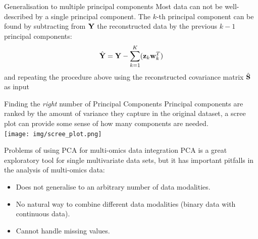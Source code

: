 \documentclass[aspectratio=169,notes]{beamer}
\newcommand\blfootnote[1]{%
  \begingroup
  \renewcommand\thefootnote{}\footnote{#1}%
  \addtocounter{footnote}{-1}%
  \endgroup
}
\begin{document}



	\begin{frame}{Generalisation to multiple principal components}
	Most data can not be well-described by a single principal component. The $k$-th principal component can be found by subtracting from ${\bf Y}$ the reconstructed data by the previous $k-1$ principal components: 
	\[
		\hat{{\bf Y}} = {\bf Y} - \sum_{k=1}^{K} ({\bf z}_k {\bf w}_k^T)
	\]
	and repeating the procedure above using the reconstructed covariance matrix $\hat{{\bf S}}$ as input
	\end{frame}

	\begin{frame}{Finding the \textit{right} number of Principal Components}
	Principal components are ranked by the amount of variance they capture in the original dataset, a scree plot can provide some sense of how many components are needed.\\
	\leavevmode\newline
	\centering
	\texttt{[image: img/scree\_plot.png]}
	\end{frame}

	\begin{frame}{Problems of using PCA for multi-omics data integration}
	PCA is a great exploratory tool for single multivariate data sets, but it has important pitfalls in the analysis of multi-omics data:
	\begin{itemize}
		\item Does not generalise to an arbitrary number of data modalities.
		\item No natural way to combine different data modalities (binary data with continuous data).
		\item Cannot handle missing values.
	\end{itemize}
	\end{frame}
\end{document}
